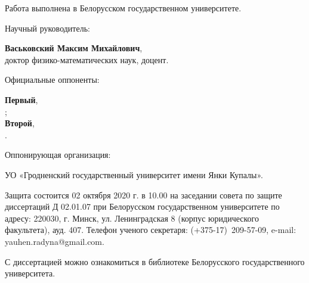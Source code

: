 \documentclass[_00_autoref.tex]{subfiles}
\begin{document}
\pagestyle{empty}
\setlength{\voffset}{-18mm}
\noindent Работа выполнена в Белорусском государственном университете.

\noindent
\begin{minipage}[t]{0.38\textwidth}
  \begin{flushleft}
    Научный руководитель:
  \end{flushleft}
\end{minipage}
\begin{minipage}[t]{0.61\textwidth}
  \begin{flushleft}
    \textbf{Васьковский Максим Михайлович},\\
    доктор физико-математических наук, доцент.
  \end{flushleft}
\end{minipage}

\medskip
\noindent
\begin{minipage}[t]{0.38\textwidth}
    \begin{flushleft}
        Официальные оппоненты:
    \end{flushleft}
\end{minipage}
\begin{minipage}[t]{0.61\textwidth}
    \begin{flushleft}
        \textbf{Первый},\\
        ;\\

        \textbf{Второй},\\
        .\\
\medskip
  \end{flushleft}
\end{minipage}

\medskip
\noindent
\begin{minipage}[t]{0.38\textwidth}
    \begin{flushleft}
        Оппонирующая организация:
    \end{flushleft}
\end{minipage}
\begin{minipage}[t]{0.61\textwidth}
    \begin{flushleft}
        УО «Гродненский государственный университет имени Янки Купалы».
    \medskip
  \end{flushleft}
\end{minipage}


{

Защита состоится 02 октября 2020 г. в 10.00 на заседании совета
по защите диссертаций Д 02.01.07 при Белорусском государственном университете
по адресу: 220030, г. Минск, ул. Ленинградская 8 (корпус юридического факультета),
ауд. 407. Телефон ученого секретаря: (+375-17)~209-57-09, e-mail: yauhen.radyna@gmail.com. 

С диссертацией можно ознакомиться в библиотеке
Белорусского государственного университета.
}
\end{document}

